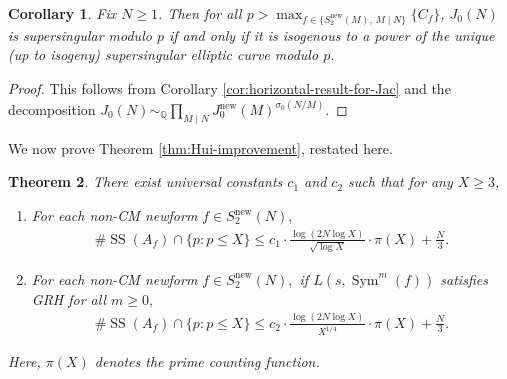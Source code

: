 \documentclass[11pt,letterpaper,reqno]{amsart}
\newtheorem{theorem}{Theorem}[section]
\newtheorem{corollary}[theorem]{Corollary}
\theoremstyle{definition}
\numberwithin{equation}{section}
\numberwithin{figure}{section}
\numberwithin{table}{section}
\newcommand{\nw}{\mathrm{new}}
\begin{document}
\begin{corollary}\label{cor:horizontal-result-for-Jac-full}
    Fix $N \ge 1$. Then for all $p > \max_{f \in  \{S^\nw_2(M),\, M \mid N\}} \{C_f\}$, $J_0(N)$ is supersingular modulo $p$ if and only if
    it is isogenous to a power of the unique (up to isogeny) supersingular elliptic curve modulo $p$. 
\end{corollary}


\begin{proof}
    This follows from Corollary \ref{cor:horizontal-result-for-Jac} and the decomposition $J_0(N) \sim_{\mathbb{Q}} \prod_{M \mid N} J_0^{\nw}(M)^{\sigma_0(N/M)}$. 
\end{proof}


We now prove Theorem \ref{thm:Hui-improvement}, restated here.

{
\renewcommand{\thetheorem}{\ref{thm:Hui-improvement}}
\addtocounter{theorem}{-1}
\begin{theorem}
    There exist universal constants $c_1$ and $c_2$ such that for any $X \geq 3$,
    \begin{enumerate}
        \item For each non-CM newform $f \in S_2^\nw(N),$
    \begin{align}
        \#  \operatorname{SS}(A_f) \cap \{p : p \leq X\} \leq c_1 \cdot \frac{\log (2N \log X)}{\sqrt{\log X}} \cdot \pi(X) + \frac{N}{3}.
    \end{align}
    \item For each non-CM newform $f \in S_2^\nw(N),$ if $L(s, \operatorname{Sym}^m (f))$ satisfies GRH for all $m \geq 0,$
    \begin{align}
        \#  \operatorname{SS}(A_f) \cap \{p : p \leq X\} \leq c_2 \cdot \frac{\log (2N \log X)}{X^{1/4}} \cdot \pi(X) + \frac{N}{3}.
    \end{align}
    \end{enumerate}
    Here, $\pi(X)$ denotes the prime counting function.
\end{theorem}
}
    
\end{document}
